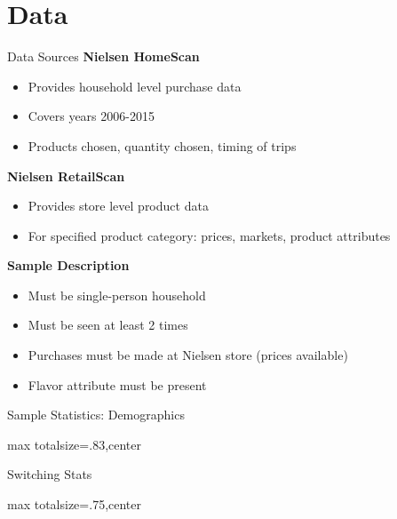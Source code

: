 \documentclass[aspectratio=169,professionalfonts]{beamer}
\newcommand{\shortbuttons}{}
\begin{document}
\section{Data}

\gdef\shortbuttons{\hyperlink{short-22}{\beamergotobutton{Activity}}}
\begin{frame}[label=short-21]{Data Sources}
  \textbf{Nielsen HomeScan}
  \begin{itemize}
    \item Provides household level purchase data
    \item Covers years 2006-2015
    \item Products chosen, quantity chosen, timing of trips
  \end{itemize}
  \textbf{Nielsen RetailScan}
  \begin{itemize}
    \item Provides store level product data
    \item For specified product category: prices, markets, product attributes
  \end{itemize}
  \textbf{Sample Description}
  \begin{itemize}
    \item Must be single-person household
    \item Must be seen at least 2 times
    \item Purchases must be made at Nielsen store (prices available)
    \item Flavor attribute must be present
  \end{itemize}
\end{frame}


\gdef\shortbuttons{}
\begin{frame}[label=short-23]{Sample Statistics: Demographics}
  \centering
  \begin{adjustbox}{max totalsize={\textwidth}{.83\textheight},center}
    \begin{minipage}{\textwidth}
      
    \end{minipage}
  \end{adjustbox}
\end{frame}

\gdef\shortbuttons{}
\begin{frame}[label=short-24]{Switching Stats}
    \centering
    \begin{adjustbox}{max totalsize={\textwidth}{.75\textheight},center}
    \begin{minipage}{\textwidth}
      
    \end{minipage}%
    \end{adjustbox}
\end{frame}
\end{document}
